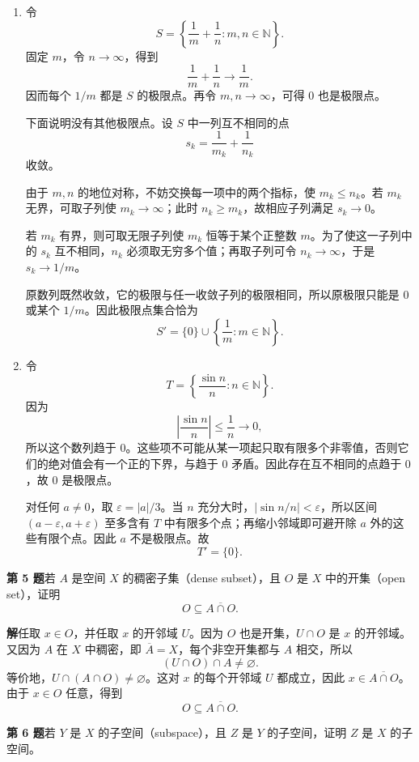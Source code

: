 \documentclass[UTF8,a4paper,11pt,fontset=windows]{ctexart}
\newcommand{\problem}[1]{\par\addvspace{10pt}\textbf{第 #1 题}\quad}
\begin{document}
\begin{enumerate}
  \item 令
  \[
    S=\left\{\frac1m+\frac1n:m,n\in\mathbb N\right\}.
  \]
  固定 $m$，令 $n\to\infty$，得到
  \[
    \frac1m+\frac1n\longrightarrow\frac1m.
  \]
  因而每个 $1/m$ 都是 $S$ 的极限点。再令 $m,n\to\infty$，可得 $0$ 也是极限点。

  下面说明没有其他极限点。设 $S$ 中一列互不相同的点
  \[
    s_k=\frac1{m_k}+\frac1{n_k}
  \]
  收敛。
  
  由于 $m,n$ 的地位对称，不妨交换每一项中的两个指标，使 $m_k\leq n_k$。若 $m_k$ 无界，可取子列使 $m_k\to\infty$；此时 $n_k\geq m_k$，故相应子列满足 $s_k\to0$。
  
  若 $m_k$ 有界，则可取无限子列使 $m_k$ 恒等于某个正整数 $m$。为了使这一子列中的 $s_k$ 互不相同，$n_k$ 必须取无穷多个值；再取子列可令 $n_k\to\infty$，于是 $s_k\to1/m$。
  
  原数列既然收敛，它的极限与任一收敛子列的极限相同，所以原极限只能是 $0$ 或某个 $1/m$。因此极限点集合恰为
  \[
    S'=\{0\}\cup\left\{\frac1m:m\in\mathbb N\right\}.
  \]

  \item 令
  \[
    T=\left\{\frac{\sin n}{n}:n\in\mathbb N\right\}.
  \]
  因为
  \[
    \left|\frac{\sin n}{n}\right|\leq\frac1n\longrightarrow0,
  \]
  所以这个数列趋于 $0$。这些项不可能从某一项起只取有限多个非零值，否则它们的绝对值会有一个正的下界，与趋于 $0$ 矛盾。因此存在互不相同的点趋于 $0$，故 $0$ 是极限点。

  对任何 $a\neq0$，取 $\varepsilon=|a|/3$。当 $n$ 充分大时，$|\sin n/n|<\varepsilon$，所以区间 $(a-\varepsilon,a+\varepsilon)$ 至多含有 $T$ 中有限多个点；再缩小邻域即可避开除 $a$ 外的这些有限个点。因此 $a$ 不是极限点。故
  \[
    T'=\{0\}.
  \]
\end{enumerate}


\problem{5}若 $A$ 是空间 $X$ 的稠密子集（dense subset），且 $O$ 是 $X$ 中的开集（open set），证明
\[
  O\subseteq\overline{A\cap O}.
\]

\textbf{解}任取 $x\in O$，并任取 $x$ 的开邻域 $U$。因为 $O$ 也是开集，$U\cap O$ 是 $x$ 的开邻域。又因为 $A$ 在 $X$ 中稠密，即 $\overline A=X$，每个非空开集都与 $A$ 相交，所以
\[
  (U\cap O)\cap A\neq\varnothing.
\]
等价地，$U\cap(A\cap O)\neq\varnothing$。这对 $x$ 的每个开邻域 $U$ 都成立，因此 $x\in\overline{A\cap O}$。由于 $x\in O$ 任意，得到
\[
  O\subseteq\overline{A\cap O}.
\]

\problem{6}若 $Y$ 是 $X$ 的子空间（subspace），且 $Z$ 是 $Y$ 的子空间，证明 $Z$ 是 $X$ 的子空间。
\end{document}
